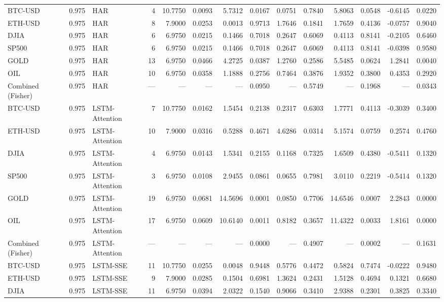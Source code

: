 \begin{table}[ht]
\begin{tabular}{lllrrrrrrrrrrr}
BTC-USD & 0.975 & HAR & 4 & 10.7750 & 0.0093 & 5.7312 & 0.0167 & 0.0751 & 0.7840 & 5.8063 & 0.0548 & -0.6145 & 0.0220 \\
ETH-USD & 0.975 & HAR & 8 & 7.9000 & 0.0253 & 0.0013 & 0.9713 & 1.7646 & 0.1841 & 1.7659 & 0.4136 & -0.0757 & 0.9040 \\
DJIA & 0.975 & HAR & 6 & 6.9750 & 0.0215 & 0.1466 & 0.7018 & 0.2647 & 0.6069 & 0.4113 & 0.8141 & -0.2105 & 0.6460 \\
SP500 & 0.975 & HAR & 6 & 6.9750 & 0.0215 & 0.1466 & 0.7018 & 0.2647 & 0.6069 & 0.4113 & 0.8141 & -0.0398 & 0.9580 \\
GOLD & 0.975 & HAR & 13 & 6.9750 & 0.0466 & 4.2725 & 0.0387 & 1.2760 & 0.2586 & 5.5485 & 0.0624 & 1.2841 & 0.0040 \\
OIL & 0.975 & HAR & 10 & 6.9750 & 0.0358 & 1.1888 & 0.2756 & 0.7464 & 0.3876 & 1.9352 & 0.3800 & 0.4353 & 0.2920 \\
Combined (Fisher) & 0.975 & HAR & — & — & — & — & 0.0950 & — & 0.5749 & — & 0.1968 & — & 0.0343 \\
BTC-USD & 0.975 & LSTM-Attention & 7 & 10.7750 & 0.0162 & 1.5454 & 0.2138 & 0.2317 & 0.6303 & 1.7771 & 0.4113 & -0.3039 & 0.3400 \\
ETH-USD & 0.975 & LSTM-Attention & 10 & 7.9000 & 0.0316 & 0.5288 & 0.4671 & 4.6286 & 0.0314 & 5.1574 & 0.0759 & 0.2574 & 0.4760 \\
DJIA & 0.975 & LSTM-Attention & 4 & 6.9750 & 0.0143 & 1.5341 & 0.2155 & 0.1168 & 0.7325 & 1.6509 & 0.4380 & -0.5411 & 0.1320 \\
SP500 & 0.975 & LSTM-Attention & 3 & 6.9750 & 0.0108 & 2.9455 & 0.0861 & 0.0655 & 0.7981 & 3.0110 & 0.2219 & -0.5414 & 0.1320 \\
GOLD & 0.975 & LSTM-Attention & 19 & 6.9750 & 0.0681 & 14.5696 & 0.0001 & 0.0850 & 0.7706 & 14.6546 & 0.0007 & 2.2843 & 0.0000 \\
OIL & 0.975 & LSTM-Attention & 17 & 6.9750 & 0.0609 & 10.6140 & 0.0011 & 0.8182 & 0.3657 & 11.4322 & 0.0033 & 1.8161 & 0.0000 \\
Combined (Fisher) & 0.975 & LSTM-Attention & — & — & — & — & 0.0000 & — & 0.4907 & — & 0.0002 & — & 0.1631 \\
BTC-USD & 0.975 & LSTM-SSE & 11 & 10.7750 & 0.0255 & 0.0048 & 0.9448 & 0.5776 & 0.4472 & 0.5824 & 0.7474 & -0.0222 & 0.9480 \\
ETH-USD & 0.975 & LSTM-SSE & 9 & 7.9000 & 0.0285 & 0.1504 & 0.6981 & 1.3624 & 0.2431 & 1.5128 & 0.4694 & 0.1321 & 0.6680 \\
DJIA & 0.975 & LSTM-SSE & 11 & 6.9750 & 0.0394 & 2.0322 & 0.1540 & 0.9066 & 0.3410 & 2.9388 & 0.2301 & 0.3825 & 0.3340 \\

\end{tabular}
\end{table}
